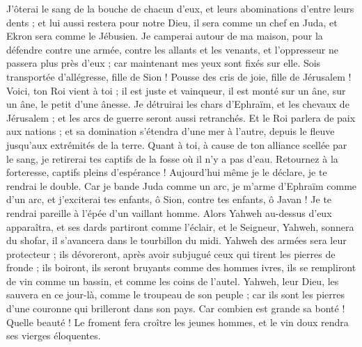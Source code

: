 \begin{multicols}{2}
J'ôterai le sang de la bouche de chacun d'eux, et leurs abominations d'entre leurs dents ; et lui aussi restera pour notre Dieu, il sera comme un chef en Juda, et Ekron sera comme le Jébusien.
Je camperai autour de ma maison, pour la défendre contre une armée, contre les allants et les venants, et l'oppresseur ne passera plus près d'eux ; car maintenant mes yeux sont fixés sur elle.
Sois transportée d'allégresse, fille de Sion ! Pousse des cris de joie, fille de Jérusalem ! Voici, ton Roi vient à toi ; il est juste et vainqueur, il est monté sur un âne, sur un âne, le petit d'une ânesse.
Je détruirai les chars d'Ephraïm, et les chevaux de Jérusalem ; et les arcs de guerre seront aussi retranchés. Et le Roi parlera de paix aux nations ; et sa domination s'étendra d'une mer à l'autre, depuis le fleuve jusqu'aux extrémités de la terre.
Quant à toi, à cause de ton alliance scellée par le sang, je retirerai tes captifs de la fosse où il n'y a pas d'eau.
Retournez à la forteresse, captifs pleins d'espérance ! Aujourd'hui même je le déclare, je te rendrai le double.
Car je bande Juda comme un arc, je m'arme d'Ephraïm comme d'un arc, et j'exciterai tes enfants, ô Sion, contre tes enfants, ô Javan ! Je te rendrai pareille à l'épée d'un vaillant homme.
Alors Yahweh au-dessus d'eux apparaîtra, et ses dards partiront comme l'éclair, et le Seigneur, Yahweh, sonnera du shofar, il s'avancera dans le tourbillon du midi.
Yahweh des armées sera leur protecteur ; ils dévoreront, après avoir subjugué ceux qui tirent les pierres de fronde ; ils boiront, ils seront bruyants comme des hommes ivres, ils se rempliront de vin comme un bassin, et comme les coins de l'autel.
Yahweh, leur Dieu, les sauvera en ce jour-là, comme le troupeau de son peuple ; car ils sont les pierres d'une couronne qui brilleront dans son pays.
Car combien est grande sa bonté ! Quelle beauté ! Le froment fera croître les jeunes hommes, et le vin doux rendra ses vierges éloquentes.

\end{multicols}
